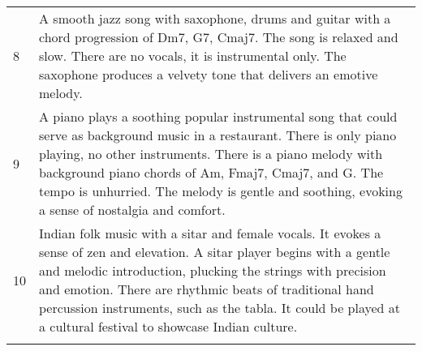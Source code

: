 \documentclass[11pt]{article}
\begin{document}
\begin{table*}[h]
\begin{tabular}{p{0.4cm} p{15cm}}
8& A smooth jazz song with saxophone, drums and guitar with a chord progression of Dm7, G7, Cmaj7. The song is relaxed and slow. There are no vocals, it is instrumental only. The saxophone produces a velvety tone that delivers an emotive melody. \\
9& A piano plays a soothing popular instrumental song that could serve as background music in a restaurant. There is only piano playing, no other instruments. There is a piano melody with background piano chords of Am, Fmaj7, Cmaj7, and G. The tempo is unhurried. The melody is gentle and soothing, evoking a sense of nostalgia and comfort.    \\
10& Indian folk music with a sitar and female vocals. It evokes a sense of zen and elevation. A sitar player begins with a gentle and melodic introduction, plucking the strings with precision and emotion. There are rhythmic beats of traditional hand percussion instruments, such as the tabla. It could be played at a cultural festival to showcase Indian culture.    \\
  \\ \bottomrule
\end{tabular}
\end{table*}
\end{document}
